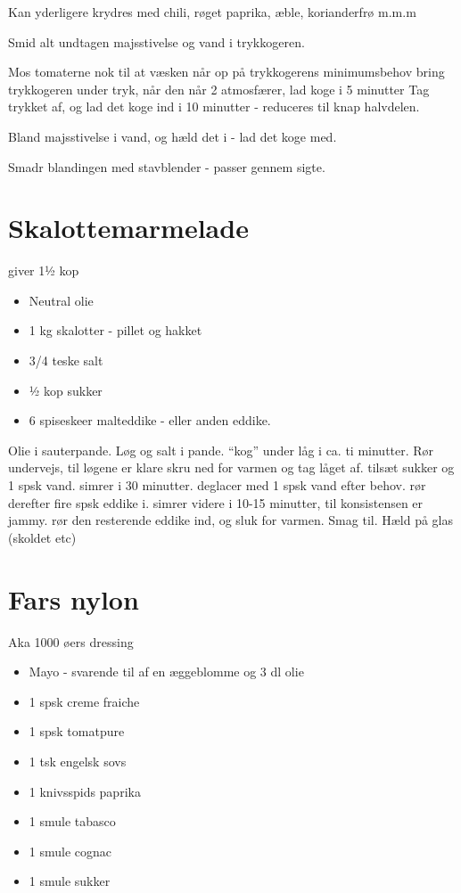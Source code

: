 \documentclass[
]{book}
\providecommand{\tightlist}{%
  \setlength{\itemsep}{0pt}\setlength{\parskip}{0pt}}
\begin{document}
Kan yderligere krydres med chili, røget paprika, æble, korianderfrø
m.m.m

Smid alt undtagen majsstivelse og vand i trykkogeren.

Mos tomaterne nok til at væsken når op på trykkogerens minimumsbehov
bring trykkogeren under tryk, når den når 2 atmosfærer, lad koge i
5 minutter
Tag trykket af, og lad det koge ind i 10 minutter - reduceres til knap
halvdelen.

Bland majsstivelse i vand, og hæld det i - lad det koge med.

Smadr blandingen med stavblender - passer gennem sigte.

\section{Skalottemarmelade}\label{skalottemarmelade}

giver 1½ kop

\begin{itemize}
\tightlist
\item
  Neutral olie
\item
  1 kg skalotter - pillet og hakket
\item
  3/4 teske salt
\item
  ½ kop sukker
\item
  6 spiseskeer malteddike - eller anden eddike.
\end{itemize}

Olie i sauterpande.
Løg og salt i pande.
``kog'' under låg i ca. ti minutter. Rør undervejs, til løgene er klare
skru ned for varmen og tag låget af.
tilsæt sukker og 1 spsk vand. simrer i 30 minutter. deglacer med 1 spsk vand efter behov.
rør derefter fire spsk eddike i. simrer videre i 10-15 minutter, til konsistensen er jammy.
rør den resterende eddike ind, og sluk for varmen.
Smag til.
Hæld på glas (skoldet etc)

\section{Fars nylon}\label{fars-nylon}

Aka 1000 øers dressing

\begin{itemize}
\tightlist
\item
  Mayo - svarende til af en æggeblomme og 3 dl olie
\item
  1 spsk creme fraiche
\item
  1 spsk tomatpure
\item
  1 tsk engelsk sovs
\item
  1 knivsspids paprika
\item
  1 smule tabasco
\item
  1 smule cognac
\item
  1 smule sukker
\end{itemize}
\end{document}

